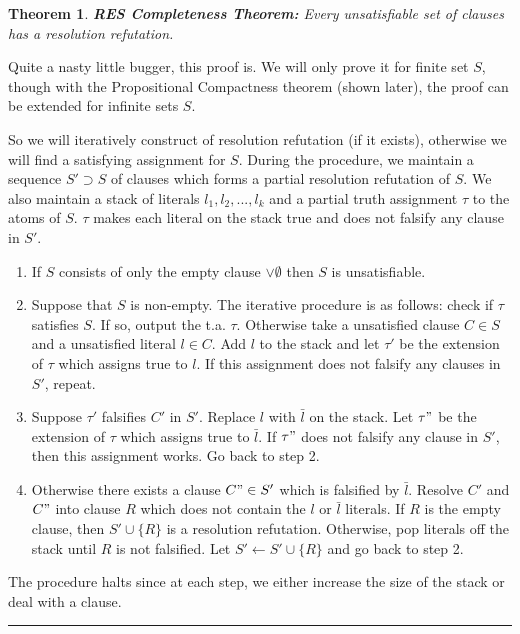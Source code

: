\documentclass[twoside]{article}
\newcounter{lecnum}
\newtheorem{theorem}{Theorem}[lecnum]
\newenvironment{proof}{{\bf Proof:}}{\hfill\rule{2mm}{2mm}}
\begin{document}
\begin{theorem}
\textbf{RES Completeness Theorem:} Every unsatisfiable set of clauses has a resolution refutation.
\end{theorem}
\begin{proof}
Quite a nasty little bugger, this proof is. We will only prove it for finite set $S$, though with the Propositional Compactness theorem (shown later), the proof can be extended for infinite sets $S$. 

So we will iteratively construct of resolution refutation (if it exists), otherwise we will find a satisfying assignment for $S$. During the procedure, we maintain a sequence $S' \supset S$ of clauses which forms a partial resolution refutation of $S$. We also maintain a stack of literals $l_1, l_2, ..., l_k$ and a partial truth assignment $\tau$ to the atoms of $S$. $\tau$ makes each literal on the stack true and does not falsify any clause in $S'$.

\begin{enumerate}
\item If $S$ consists of only the empty clause $\lor \emptyset$ then $S$ is unsatisfiable.
\item Suppose that $S$ is non-empty. The iterative procedure is as follows: check if $\tau$ satisfies $S$. If so, output the t.a. $\tau$. Otherwise take a unsatisfied clause $C \in S$ and a unsatisfied literal $l \in C$. Add $l$ to the stack and let $\tau '$ be the extension of $\tau$ which assigns true to $l$. If this assignment does not falsify any clauses in $S'$, repeat.
\item Suppose $\tau '$ falsifies $C'$ in $S'$. Replace $l$ with $\bar{l}$ on the stack. Let $\tau "$ be the extension of $\tau$ which assigns true to $\bar{l}$. If $\tau "$ does not falsify any clause in $S'$, then this assignment works. Go back to step 2.
\item Otherwise there exists a clause $C" \in S'$ which is falsified by $\bar{l}$. Resolve $C'$ and $C"$ into clause $R$ which does not contain the $l$ or $\bar{l}$ literals. If $R$ is the empty clause, then $S' \cup \{R\}$ is a resolution refutation. Otherwise, pop literals off the stack until $R$ is not falsified. Let $S' \leftarrow S' \cup \{R\}$ and go back to step 2.      
\end{enumerate}

The procedure halts since at each step, we either increase the size of the stack or deal with a clause.  
\end{proof}
\end{document}
